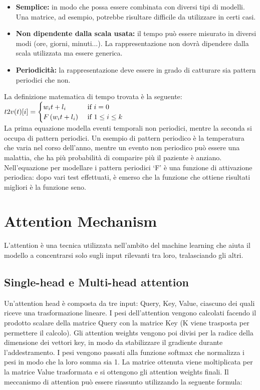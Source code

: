 \documentclass[12pt,a4paper,twoside,openright]{book}
\begin{document}
\begin{itemize}
    \item \textbf{Semplice:} in modo che possa essere combinata con diversi tipi di modelli. Una matrice, ad esempio, potrebbe risultare difficile da utilizzare in certi casi.
    \item \textbf{Non dipendente dalla scala usata:} il tempo può essere misurato in diversi modi (ore, giorni, minuti...). La rappresentazione non dovrà dipendere dalla scala utilizzata ma essere generica.
    \item \textbf{Periodicità:} la rappresentazione deve essere in grado di catturare sia pattern periodici che non.
\end{itemize}

La definizione matematica di tempo trovata è la seguente:\\

\begin{math}
t2v(t)[i] = \begin{cases}
w_{i}t + l_{i} & \text{ if } i=0 \\ 
F\left ( w_{i}t + l_{i} \right ) & \text{ if } 1\leq i\leq k 
\end{cases}\\
\end{math}
\\
La prima equazione modella eventi temporali non periodici, mentre la seconda si occupa di pattern periodici. Un esempio di pattern periodico è la temperatura che varia nel corso dell’anno, mentre un evento non periodico può essere una malattia, che ha più probabilità di comparire più il paziente è anziano. 
Nell’equazione per modellare i pattern periodici ‘F’ è una funzione di attivazione periodica: dopo vari test effettuati, è emerso che la funzione che ottiene risultati migliori è la funzione seno.

\section{Attention Mechanism}
L’attention\cite{DBLP:conf/nips/VaswaniSPUJGKP17} è una tecnica utilizzata nell’ambito del machine learning che aiuta il modello a concentrarsi solo sugli input rilevanti tra loro, tralasciando gli altri.
\subsection{Single-head e Multi-head attention}
Un'attention head è composta da tre input: Query, Key, Value, ciascuno dei quali riceve una trasformazione lineare. I pesi dell’attention vengono calcolati facendo il prodotto scalare della matrice Query con la matrice Key (K viene trasposta per permettere il calcolo). Gli attention weights vengono poi divisi per la radice della dimensione dei vettori key, in modo da stabilizzare il gradiente durante l’addestramento. I pesi vengono  passati alla funzione softmax che normalizza i pesi in modo che la loro somma sia 1. La matrice ottenuta viene moltiplicata per la matrice Value trasformata e si ottengono gli attention weights finali.
 Il meccanismo di attention può essere riassunto utilizzando la seguente formula:
\end{document}
